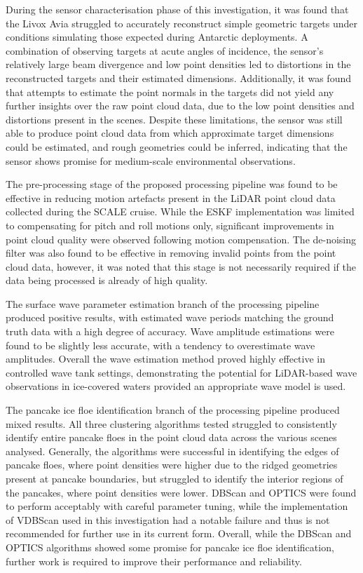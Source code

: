 During the sensor characterisation phase of this investigation, it was found that the Livox Avia struggled to accurately reconstruct simple geometric targets under conditions simulating those expected during Antarctic deployments. A combination of observing targets at acute angles of incidence, the sensor's relatively large beam divergence and low point densities led to distortions in the reconstructed targets and their estimated dimensions. Additionally, it was found that attempts to estimate the point normals in the targets did not yield any further insights over the raw point cloud data, due to the low point densities and distortions present in the scenes. Despite these limitations, the sensor was still able to produce point cloud data from which approximate target dimensions could be estimated, and rough geometries could be inferred, indicating that the sensor shows promise for medium-scale environmental observations.

The pre-processing stage of the proposed processing pipeline was found to be effective in reducing motion artefacts present in the \ac{LiDAR} point cloud data collected during the \ac{SCALE} cruise. While the \ac{ESKF} implementation was limited to compensating for pitch and roll motions only, significant improvements in point cloud quality were observed following motion compensation. The de-noising filter was also found to be effective in removing invalid points from the point cloud data, however, it was noted that this stage is not necessarily required if the data being processed is already of high quality.

The surface wave parameter estimation branch of the processing pipeline produced positive results, with estimated wave periods matching the ground truth data with a high degree of accuracy. Wave amplitude estimations were found to be slightly less accurate, with a tendency to overestimate wave amplitudes. Overall the wave estimation method proved highly effective in controlled wave tank settings, demonstrating the potential for \ac{LiDAR}-based wave observations in ice-covered waters provided an appropriate wave model is used.

The pancake ice floe identification branch of the processing pipeline produced mixed results. All three clustering algorithms tested struggled to consistently identify entire pancake floes in the point cloud data across the various scenes analysed. Generally, the algorithms were successful in identifying the edges of pancake floes, where point densities were higher due to the ridged geometries present at pancake boundaries, but struggled to identify the interior regions of the pancakes, where point densities were lower. \ac{DBScan} and \ac{OPTICS} were found to perform acceptably with careful parameter tuning, while the implementation of \ac{VDBScan} used in this investigation had a notable failure and thus is not recommended for further use in its current form. Overall, while the \ac{DBScan} and \ac{OPTICS} algorithms showed some promise for pancake ice floe identification, further work is required to improve their performance and reliability.

